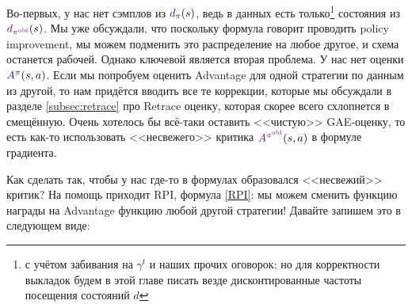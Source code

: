 Во-первых, у нас нет сэмплов из $\textcolor{ChadBlue}{d_\pi}(s)$, ведь в данных есть только\footnote{с учётом забивания на $\gamma^t$ и наших прочих оговорок; но для корректности выкладок будем в этой главе писать везде дисконтированные частоты посещения состояний $d$} состояния из $\textcolor{ChadPurple}{d_{\pi^{\old}}}(s)$. Мы уже обсуждали, что поскольку формула говорит проводить policy improvement, мы можем подменить это распределение на любое другое, и схема останется рабочей. Однако ключевой является вторая проблема. У нас нет оценки $\textcolor{ChadBlue}{A^{\pi}}(s, a)$. Если мы попробуем оценить Advantage для одной стратегии по данным из другой, то нам придётся вводить все те коррекции, которые мы обсуждали в разделе \ref{subsec:retrace} про Retrace оценку, которая скорее всего схлопнется в смещённую. Очень хотелось бы всё-таки оставить <<чистую>> GAE-оценку, то есть как-то использовать <<несвежего>> критика  $\textcolor{ChadPurple}{A^{\pi^{\old}}}(s, a)$ в формуле градиента.


Как сделать так, чтобы у нас где-то в формулах образовался <<несвежий>> критик? На помощь приходит RPI, формула \eqref{RPI}: мы можем сменить функцию награды на Advantage функцию любой другой стратегии! Давайте запишем это в следующем виде:

